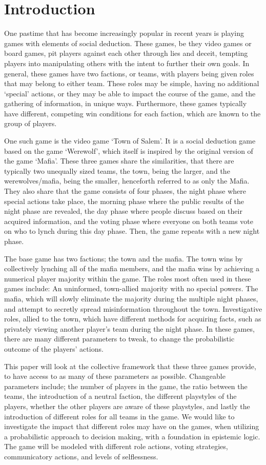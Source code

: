\section{Introduction}
One pastime that has become increasingly popular in recent years is playing
games with elements of social deduction. These games, be they video games or
board games, pit players against each other through lies and deceit, tempting
players into manipulating others with the intent to further their own goals. In
general, these games have two factions, or teams, with players being given
roles that may belong to either team. These roles may be simple, having no
additional ‘special’ actions, or they may be able to impact the course of the
game, and the gathering of information, in unique ways. Furthermore, these
games typically have different, competing win conditions for each faction,
which are known to the group of players.

One such game is the video game ‘Town of Salem’. It is a social deduction game
based on the game ‘Werewolf’, which itself is inspired by the original version
of the game ‘Mafia’. These three games share the similarities, that there are
typically two unequally sized teams, the town, being the larger, and the
werewolves/mafia, being the smaller, henceforth referred to as only the Mafia.
They also share that the game consists of four phases, the night phase where
special actions take place, the morning phase where the public results of the
night phase are revealed, the day phase where people discuss based on their
acquired information, and the voting phase where everyone on both teams vote on
who to lynch during this day phase. Then, the game repeats with a new night
phase.

The base game has two factions; the town and the mafia. The town wins by
collectively lynching all of the mafia members, and the mafia wins by achieving
a numerical player majority within the game. The roles most often used in these
games include: An uninformed, town-allied majority with no special powers. The
mafia, which will slowly eliminate the majority during the multiple night
phases, and attempt to secretly spread misinformation throughout the town.
Investigative roles, allied to the town, which have different methods for
acquiring facts, such as privately viewing another player’s team during the
night phase. In these games, there are many different parameters to tweak, to
change the probabilistic outcome of the players’ actions.

This paper will look at the collective framework that these three games
provide, to have access to as many of these parameters as possible. Changeable
parameters include; the number of players in the game, the ratio between the
teams, the introduction of a neutral faction, the different playstyles of the
players, whether the other players are aware of these playstyles, and lastly
the introduction of different roles for all teams in the game. We would like to
investigate the impact that different roles may have on the games, when
utilizing a probabilistic approach to decision making, with a foundation in
epistemic logic. The game will be modeled with different role actions, voting
strategies, communicatory actions, and levels of selflessness.